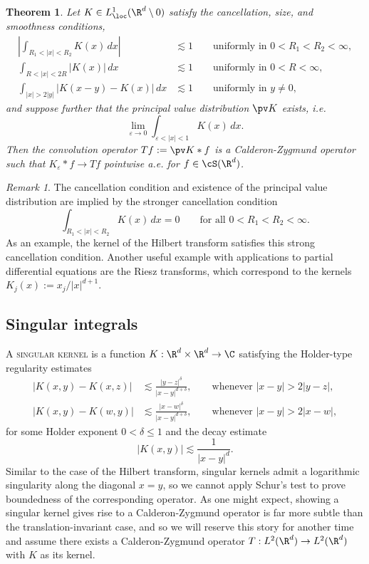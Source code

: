 \documentclass[reqno]{amsart}
\newtheorem{theorem}{Theorem}
\theoremstyle{definition}
\theoremstyle{remark}
\newtheorem*{remark}{Remark}
\renewcommand{\epsilon}{\varepsilon}
\renewcommand{\emph}{\textsc}
\begin{document}
\begin{theorem}
	Let $K \in L^1_{\loc} (\R^d \setminus 0)$ satisfy the cancellation, size, and smoothness conditions,
	\begin{align*}
		 \left| \int_{R_1 < |x| < R_2} K(x) \, dx \right| 
		 	&\lesssim 1 \qquad \text{uniformly in $0 < R_1 < R_2 < \infty$}, \\
		 \int_{R < |x| < 2R} |K(x)| \, dx 
		 	&\lesssim 1 \qquad \text{uniformly in $0 < R < \infty$}, \\
		 \int_{|x| > 2|y|} |K(x - y) - K(x)| \, dx 
		 	&\lesssim 1 \qquad \text{uniformly in $y \neq 0$,}
	\end{align*}
	and suppose further that the principal value distribution $\pv K$ exists, i.e.
		\[ \lim_{\epsilon \to 0} \int_{\epsilon < |x| < 1} K(x) \, dx. \]
	Then the convolution operator $T f := \pv K * f$ is a Calderon-Zygmund operator such that $K_\epsilon * f \to Tf$ pointwise a.e. for $f \in \cS (\R^d)$. \label{thm:czconvolution}
\end{theorem}

\begin{remark}
	The cancellation condition and existence of the principal value distribution are implied by the stronger cancellation condition 
		\[ \int_{R_1 < |x| < R_2} K(x) \, dx = 0 \qquad \text{for all $0 < R_1 < R_2 < \infty$}. \]
	As an example, the kernel of the Hilbert transform satisfies this strong cancellation condition. Another useful example with applications to partial differential equations are the Riesz transforms, which correspond to the kernels $K_j (x) := x_j/|x|^{d + 1}$.
\end{remark}

\subsection{Singular integrals}

A \emph{singular kernel} is a function $K : \R^d \times \R^d \to \C$ satisfying the Holder-type regularity estimates
	\begin{align*}
			|K(x, y) - K(x, z)| 
				&\lesssim \frac{|y - z|^\delta}{|x - y|^{d + \delta}},	\qquad \text{whenever } |x - y| > 2|y - z|,\\
			|K(x, y) - K(w, y)| 
				&\lesssim \frac{|x - w|^\delta}{|x - y|^{d + \delta}},	\qquad \text{whenever } |x - y| > 2|x - w|	,
		\end{align*}
for some Holder exponent $0 < \delta \leq 1$ and the decay estimate
	\[ |K(x, y)| \lesssim \frac{1}{|x - y|^d}. \]
Similar to the case of the Hilbert transform, singular kernels admit a logarithmic singularity along the diagonal $x = y$, so we cannot apply Schur's test to prove boundedness of the corresponding operator. As one might expect, showing a singular kernel gives rise to a Calderon-Zygmund operator is far more subtle than the translation-invariant case, and so we will reserve this story for another time and assume there exists a Calderon-Zygmund operator $T: L^2 (\R^d) \to L^2 (\R^d)$ with $K$ as its kernel. 
\end{document}
